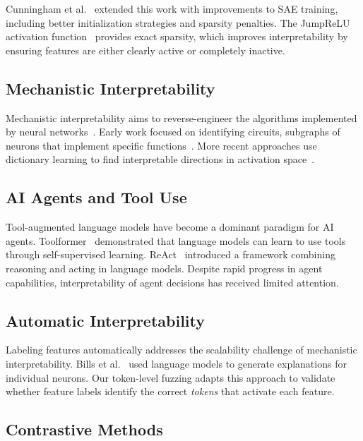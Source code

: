 \documentclass[runningheads]{llncs}
\begin{document}
Cunningham et al.~\cite{cunningham2023sparseautoencodershighlyinterpretable} extended this work with improvements to SAE training, including better initialization strategies and sparsity penalties. The JumpReLU activation function~\cite{ref_rajamanoharan2024} provides exact sparsity, which improves interpretability by ensuring features are either clearly active or completely inactive.

\subsection{Mechanistic Interpretability}

Mechanistic interpretability aims to reverse-engineer the algorithms implemented by neural networks~\cite{ref_olah2020}. Early work focused on identifying circuits, subgraphs of neurons that implement specific functions~\cite{conmy2023automatedcircuitdiscoverymechanistic}. More recent approaches use dictionary learning to find interpretable directions in activation space~\cite{ref_sharkey2022}.

\subsection{AI Agents and Tool Use}

Tool-augmented language models have become a dominant paradigm for AI agents. Toolformer~\cite{schick2023toolformerlanguagemodelsteach} demonstrated that language models can learn to use tools through self-supervised learning. ReAct~\cite{yao2023reactsynergizingreasoningacting} introduced a framework combining reasoning and acting in language models. Despite rapid progress in agent capabilities, interpretability of agent decisions has received limited attention.

\subsection{Automatic Interpretability}

Labeling features automatically addresses the scalability challenge of mechanistic interpretability. Bills et al.~\cite{ref_bills2023} used language models to generate explanations for individual neurons. Our token-level fuzzing adapts this approach to validate whether feature labels identify the correct \emph{tokens} that activate each feature.

\subsection{Contrastive Methods}
\end{document}
